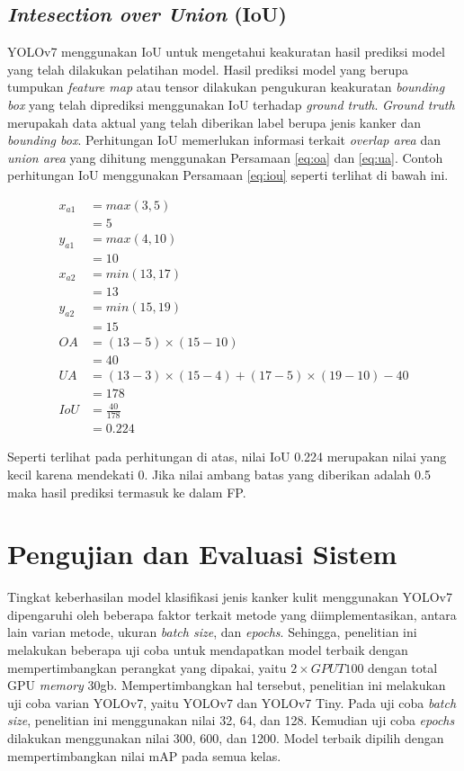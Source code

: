     \subsection{\textit{Intesection over Union} (IoU)}
    YOLOv7 menggunakan IoU untuk mengetahui keakuratan hasil prediksi model yang telah dilakukan pelatihan model. Hasil prediksi model yang berupa tumpukan \textit{feature map} atau tensor dilakukan pengukuran keakuratan \textit{bounding box} yang telah diprediksi menggunakan IoU terhadap \textit{ground truth}. \textit{Ground truth} merupakah data aktual yang telah diberikan label berupa jenis kanker dan \textit{bounding box}. Perhitungan IoU memerlukan informasi terkait \textit{overlap area} dan \textit{union area} yang dihitung menggunakan Persamaan \ref{eq:oa} dan \ref{eq:ua}. Contoh perhitungan IoU menggunakan Persamaan \ref{eq:iou} seperti terlihat di bawah ini.

    \begin{align*}
        x_{a1} &= max(3, 5)\\
               &= 5\\
        y_{a1} &= max(4, 10)\\
               &= 10\\
        x_{a2} &= min(13, 17)\\
               &= 13\\
        y_{a2} &= min(15, 19)\\
               &= 15\\
        OA     &= (13-5)\times (15-10)\\
               &= 40\\
        UA     &= (13-3)\times (15-4) + (17-5)\times (19-10) - 40\\
               &= 178\\
        IoU    &= \frac{40}{178}\\
               &= 0.224
    \end{align*}

    Seperti terlihat pada perhitungan di atas, nilai IoU 0.224 merupakan nilai yang kecil karena mendekati 0. Jika nilai ambang batas yang diberikan adalah 0.5 maka hasil prediksi termasuk ke dalam FP.

\section{Pengujian dan Evaluasi Sistem}
Tingkat keberhasilan model klasifikasi jenis kanker kulit menggunakan YOLOv7 dipengaruhi oleh beberapa faktor terkait metode yang diimplementasikan, antara lain varian metode, ukuran \textit{batch size}, dan \textit{epochs}. Sehingga, penelitian ini melakukan beberapa uji coba untuk mendapatkan model terbaik dengan mempertimbangkan perangkat yang dipakai, yaitu $2\times GPU T100$ dengan total GPU \textit{memory} 30gb. Mempertimbangkan hal tersebut, penelitian ini melakukan uji coba varian YOLOv7, yaitu YOLOv7 dan YOLOv7 Tiny. Pada uji coba \textit{batch size}, penelitian ini menggunakan nilai 32, 64, dan 128. Kemudian uji coba \textit{epochs} dilakukan menggunakan nilai 300, 600, dan 1200. Model terbaik dipilih dengan mempertimbangkan nilai mAP pada semua kelas.

